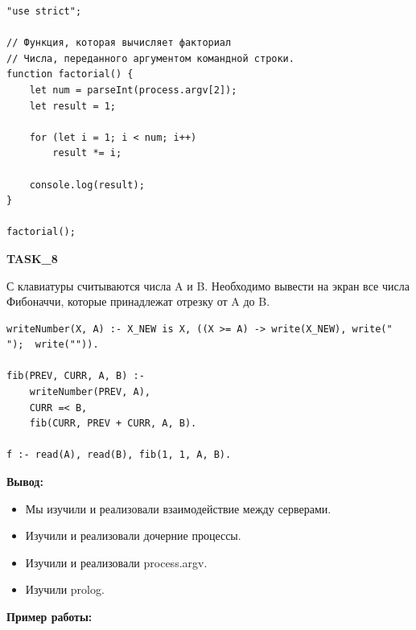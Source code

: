 \begin{lstlisting}[caption=Код программы. TASK\_2. Задание 2. Дочерний процесс.]
"use strict";

// Функция, которая вычисляет факториал
// Числа, переданного аргументом командной строки.
function factorial() {
	let num = parseInt(process.argv[2]);
	let result = 1;

	for (let i = 1; i < num; i++)
		result *= i;

	console.log(result);
}

factorial();
\end{lstlisting}

\textbf{TASK\_8}

С клавиатуры считываются числа A и B. Необходимо вывести на экран все числа Фибоначчи, которые принадлежат отрезку от A до B.

\begin{lstlisting}[caption=Числа Фибоначчи]
writeNumber(X, A) :- X_NEW is X, ((X >= A) -> write(X_NEW), write(" ");  write("")).

fib(PREV, CURR, A, B) :- 
	writeNumber(PREV, A),
	CURR =< B,
	fib(CURR, PREV + CURR, A, B).   

f :- read(A), read(B), fib(1, 1, A, B).
\end{lstlisting}


\textbf{Вывод:}

\begin{itemize} 
	\item Мы изучили и реализовали взаимодействие между серверами.
	\item Изучили и реализовали дочерние процессы.
	\item Изучили и реализовали process.argv.
	\item Изучили prolog.
\end{itemize}


\textbf{Пример работы:}

\begin{figure}[ht!]
\end{figure}


